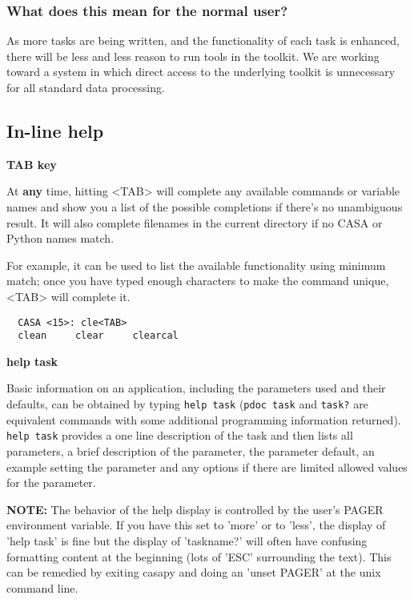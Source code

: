 \subsubsection{What does this mean for the normal user?}
\label{subsubsection:normal.user}

As more tasks are being written, and the functionality of each task is
enhanced, there will be less and less reason to run tools in the
toolkit.  We are working toward a system in which direct access to the
underlying toolkit is unnecessary for all standard data processing.

\subsection{In-line help}
\label{subsection:inline.help}

{\bf TAB key}

At {\bf any} time, hitting <TAB> will complete any available commands or
variable names and show you a list of the possible completions if
there's no unambiguous result. It will also complete filenames in the
current directory if no CASA or Python names match.

For example, it can be used to list the available functionality using
minimum match; once you have typed enough characters to make the
command unique, <TAB> will complete it. 
\small
\begin{verbatim}
  CASA <15>: cle<TAB>
  clean     clear     clearcal  
\end{verbatim}
\normalsize

{\bf help task}

Basic information on an application, including the parameters used and
their defaults, can be obtained by typing {\tt help task} ({\tt pdoc task} and
{\tt task?} are equivalent commands with some additional programming
information returned). {\tt help task} provides a one line description of
the task and then lists all parameters, a brief description of the
parameter, the parameter default, an example setting the parameter and
any options if there are limited allowed values for the parameter.

{\bf NOTE:} The behavior of the help display is controlled by the user's
PAGER environment variable. If you have this set to 'more' or to
'less', the display of 'help task' is fine but the display of
'taskname?' will often have confusing formatting content at the
beginning (lots of 'ESC' surrounding the text). This can be remedied
by exiting casapy and doing an 'unset PAGER' at the unix command line.

